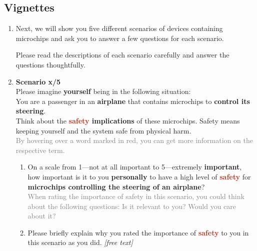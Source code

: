 \subsection{Vignettes}
\label{xhw_study::subapp::vignettes}
\begin{enumerate}
    \setcounter{enumi}{\value{qcounter}}
    \item \label{xhw_study::question::vignete_intro}
        Next, we will show you five different scenarios of devices containing microchips and ask you to answer a few questions for each scenario. 

        Please read the descriptions of each scenario carefully and answer the questions thoughtfully.
    \item \label{xhw_study::question::v0}
        \textbf{Scenario x/5}\\
        Please imagine \textbf{yourself} being in the following situation:\\
        You are a passenger in an \textbf{airplane} that contains microchips to \textbf{control its steering}.\\
        Think about the \textbf{\textcolor[HTML]{B6321C}{safety} implications} of these microchips. Safety means keeping yourself and the system safe from physical harm.\\
        \textcolor{gray}{\infosymbol By hovering over a word marked in red, you can get more information on the respective term.}
        \begin{enumerate}
            \item \label{xhw_study::question::v0_desideratum}
                On a scale from 1---not at all important to 5---extremely \textbf{important}, how important is it to you \textbf{personally} to have a high level of \textbf{\textcolor[HTML]{B6321C}{safety}} for \textbf{microchips controlling the steering of an airplane}?\\
                \textcolor{gray}{\infosymbol When rating the importance of safety in this scenario, you could think about the following questions: Is it relevant to you? Would you care about it?} 
            \item \label{xhw_study::question::v0_desideratum_open}
                Please briefly explain why you rated the importance of \textbf{\textcolor[HTML]{B6321C}{safety}} to you in this scenario as you did. \textit{[free text]}

\end{enumerate}
\end{enumerate}
